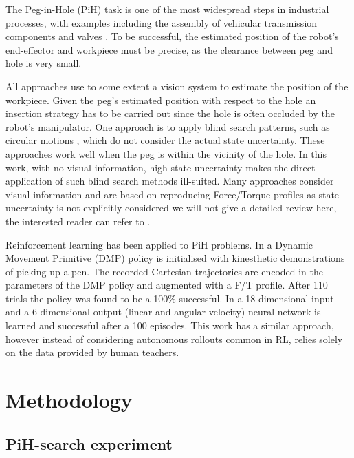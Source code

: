 \documentclass[final,5p,times,twocolumn]{elsarticle}
\begin{document}
The Peg-in-Hole (PiH) task is one of the most widespread steps in industrial processes, 
with examples including the assembly of vehicular transmission components \cite{search_strategies_icra_2001} and 
valves \cite{online_gpr_icra_2014}. To be successful, the estimated position of the robot's end-effector 
and workpiece must be precise, as the clearance between peg and hole is very small.

All approaches use to some extent a vision system \cite{peg_personal_icra_2010} to estimate 
the position of the workpiece. Given  the peg's estimated position with respect to the hole 
an insertion strategy has to be carried out since the hole is often occluded by 
the robot's manipulator. One approach is to apply blind search patterns, such as circular 
motions \cite{search_strategies_icra_2001}, which do not consider the actual state uncertainty. 
These approaches work well when the peg is within the vicinity of the hole. In this work, with 
no visual information, high state uncertainty makes the direct application of such blind 
search methods ill-suited.  Many approaches consider visual information and are based on 
reproducing Force/Torque profiles as state uncertainty is not explicitly considered we will not 
give a detailed review here, the interested reader can refer to \cite{fast_peg_pbd_icmc_2014,trans_workpiece_icra_2013,sol_pdg_pbd_2014}.

Reinforcement learning has been applied to PiH problems. In \cite{learn_force_c_icirs_2011} a Dynamic Movement Primitive (DMP) policy is 
initialised with kinesthetic demonstrations of picking up a pen. The recorded Cartesian 
trajectories are encoded in the parameters of the DMP policy and augmented with a F/T profile. 
After 110 trials the policy was found to be a 100\% successful. In \cite{learn_admittance_icra_1994} a 18 dimensional input 
and a 6 dimensional output (linear and angular velocity) neural network is learned and successful after a 100 episodes. 
This work has a similar approach, however instead of considering autonomous rollouts common in RL, relies solely on 
the data provided by human teachers.


\section{Methodology}\label{sec:experiment_methods}

\subsection{PiH-search experiment}
\end{document}
